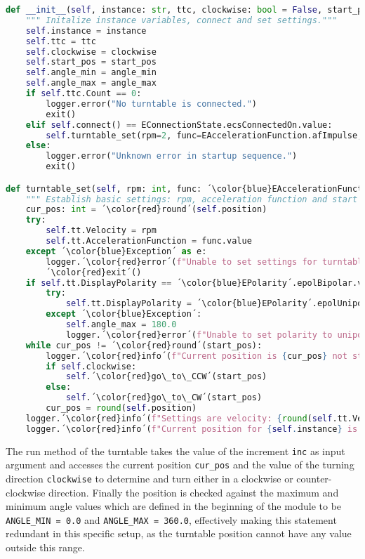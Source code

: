 \begin{lstlisting}[language=Python, caption=Method to establish settings for turntable and reach start position.]
def __init__(self, instance: str, ttc, clockwise: bool = False, start_pos: float = 0.0, angle_min: float = ANGLE_MIN, angle_max: float = ANGLE_MAX) -> None:
    """ Initalize instance variables, connect and set settings."""
    self.instance = instance
    self.ttc = ttc
    self.clockwise = clockwise
    self.start_pos = start_pos
    self.angle_min = angle_min
    self.angle_max = angle_max
    if self.ttc.Count == 0:
        logger.error("No turntable is connected.")
        exit()
    elif self.connect() == EConnectionState.ecsConnectedOn.value:
        self.turntable_set(rpm=2, func=EAccelerationFunction.afImpulse, start_pos=self.start_pos)
    else:
        logger.error("Unknown error in startup sequence.")
        exit()

def turntable_set(self, rpm: int, func: ´\color{blue}EAccelerationFunction´, start_pos: float) -> None:
    """ Establish basic settings: rpm, acceleration function and start position. """
    cur_pos: int = ´\color{red}round´(self.position)
    try:
        self.tt.Velocity = rpm
        self.tt.AccelerationFunction = func.value
    except ´\color{blue}Exception´ as e:
        logger.´\color{red}error´(f"Unable to set settings for turntable {self.instance}, exiting with error code {e}.")
        ´\color{red}exit´()
    if self.tt.DisplayPolarity == ´\color{blue}EPolarity´.epolBipolar.value:
        try:
            self.tt.DisplayPolarity = ´\color{blue}EPolarity´.epolUnipolar.value
        except ´\color{blue}Exception´:
            self.angle_max = 180.0
            logger.´\color{red}error´(f"Unable to set polarity to unipolar for turntable {self.instance}.")
    while cur_pos != ´\color{red}round´(start_pos):
        logger.´\color{red}info´(f"Current position is {cur_pos} not start position {round(start_pos)}. Moving {self.instance} to start position.")
        if self.clockwise:
            self.´\color{red}go\_to\_CCW´(start_pos)
        else:
            self.´\color{red}go\_to\_CW´(start_pos)
        cur_pos = round(self.position)
    logger.´\color{red}info´(f"Settings are velocity: {round(self.tt.Velocity)}, function: {EAccelerationFunction(self.tt.AccelerationFunction)}.")
    logger.´\color{red}info´(f"Current position for {self.instance} is {cur_pos}.")
\end{lstlisting}

The run method of the turntable takes the value of the increment \verb+inc+ as input argument and accesses the current position \verb+cur_pos+ and the value of the turning direction \verb+clockwise+ to determine and turn either in a clockwise or counter-clockwise direction. Finally the position is checked against the maximum and minimum angle values which are defined in the beginning of the module to be \verb+ANGLE_MIN = 0.0+ and \verb+ANGLE_MAX = 360.0+, effectively making this statement redundant in this specific setup, as the turntable position cannot have any value outside this range.

